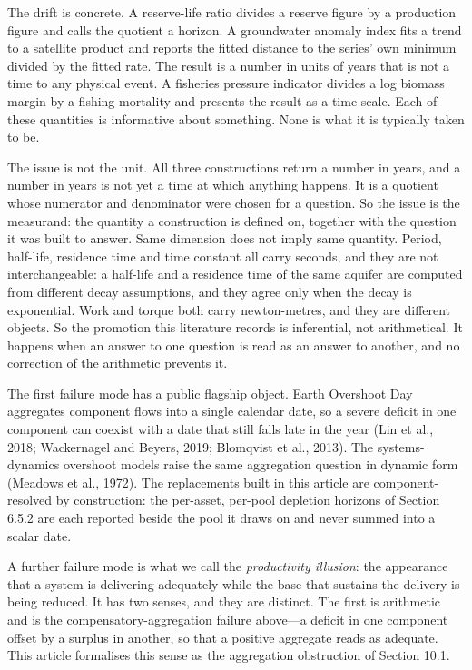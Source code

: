 \documentclass[11pt]{article}
\begin{document}
The drift is concrete. A reserve-life ratio divides a reserve figure by
a production figure and calls the quotient a horizon. A groundwater
anomaly index fits a trend to a satellite product and reports the fitted
distance to the series' own minimum divided by the fitted rate. The
result is a number in units of years that is not a time to any physical
event. A fisheries pressure indicator divides a log biomass margin by a
fishing mortality and presents the result as a time scale. Each of these quantities is informative about something. None is what it is typically taken to be.

The issue is not the unit. All three constructions return a number in years, and a number in years is not yet a time at which anything happens. It is a quotient whose numerator and denominator were chosen for a question. So the issue is the measurand: the quantity a construction is defined on, together with the question it was built to answer. Same dimension does not imply same quantity. Period, half-life, residence time and time constant all carry seconds, and they are not interchangeable: a half-life and a residence time of the same aquifer are computed from different decay assumptions, and they agree only when the decay is exponential. Work and torque both carry newton-metres, and they are different objects. So the promotion this literature records is inferential, not arithmetical. It happens when an answer to one question is read as an answer to another, and no correction of the arithmetic prevents it.

The first failure mode has a public flagship object. Earth Overshoot Day
aggregates component flows into a single calendar date, so a severe
deficit in one component can coexist with a date that still falls late
in the year (Lin et al., 2018; Wackernagel and Beyers, 2019; Blomqvist
et al., 2013). The systems-dynamics overshoot models raise the same
aggregation question in dynamic form (Meadows et al., 1972). The
replacements built in this article are component-resolved by
construction: the per-asset, per-pool depletion horizons of Section
6.5.2 are each reported beside the pool it draws on and never summed
into a scalar date.

A further failure mode is what we call the \emph{productivity illusion}:
the appearance that a system is delivering adequately while the base
that sustains the delivery is being reduced. It has two senses, and they
are distinct. The first is arithmetic and is the
compensatory-aggregation failure above---a deficit in one component
offset by a surplus in another, so that a positive aggregate reads as
adequate. This article formalises this sense as the aggregation
obstruction of Section 10.1.
\end{document}
